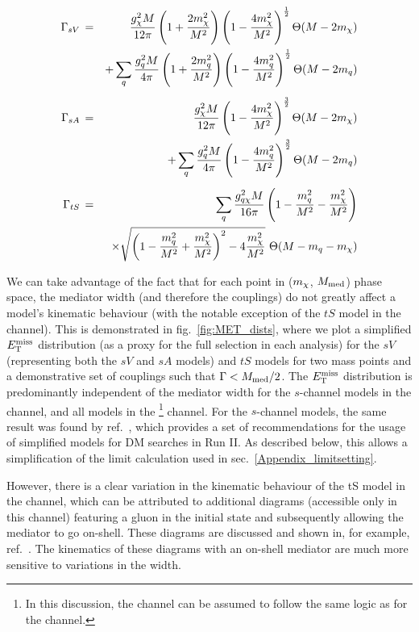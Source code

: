 \begin{eqnarray}
    \Gamma_{sV} \, &=& \,  \frac{g_{\chi}^2 M}{12\pi}\left(1 + \frac{2 m_{\chi}^{2}}{M^{2}}\right)\left(1 - \frac{4 m_{\chi}^{2}}{M^{2}}\right)^{\frac{1}{2}} \Theta(M-2 m_{\chi}) \nonumber\\
                  && + \sum_{\substack{q}}\frac{g_q^2M}{4\pi}\left(1 + \frac{2m_{q}^{2}}{M^{2}}\right)\left(1 - \frac{4m_{q}^{2}}{M^{2}}\right)^{\frac{1}{2}} \Theta(M-2m_q)\\[5pt]
    \Gamma_{sA} \, &=& \,  \frac{g_{\chi}^2 M}{12\pi}\left(1 - \frac{4 m_{\chi}^{2}}{M^{2}}\right)^{\frac{3}{2}} \Theta(M-2 m_{\chi}) \nonumber\\
                  && + \sum_{\substack{q}}\frac{g_q^2 M}{4\pi}\left(1 - \frac{4m_{q}^{2}}{M^{2}}\right)^{\frac{3}{2}} \Theta(M-2m_q) \\[5pt]
    \Gamma_{tS} \, &=& \,  \sum_{\substack{q}} \frac{g_{q \chi}^2M}{16\pi}\left(1 - \frac{m_{q}^{2}}{M^{2}} - \frac{m_{\chi}^{2}}{M^{2}}\right) \nonumber\\
                  && \times \sqrt{\left(1 - \frac{m_{q}^{2}}{M^{2}} + \frac{m_{\chi}^{2}}{M^{2}}\right)^{2} - 4\frac{m_{\chi}^{2}}{M^{2}}} \,\, \Theta(M-m_q- m_{\chi})
\end{eqnarray}

We can take advantage of the fact that for each point in ($m_{\chi}$, $M_{\mathrm{med}}$) phase space, the mediator width (and therefore the couplings) do not greatly affect a model's kinematic behaviour (with the notable exception of the $tS$ model in the \monojet channel). This is demonstrated in fig.~\ref{fig:MET_dists}, where we plot a simplified $E_{\mathrm{T}}^{\mathrm{miss}}$ distribution (as a proxy for the full selection in each analysis) for the $sV$ (representing both the $sV$ and $sA$ models) and $tS$ models for two mass points and a demonstrative set of couplings such that $\Gamma < M_{\mathrm{med}}/2$. The $E_{\mathrm{T}}^{\mathrm{miss}}$ distribution is predominantly independent of the mediator width for the $s$-channel models in the \monojet channel, and all models in the \monoZ\footnote{In this discussion, the \monoWZ channel can be assumed to follow the same logic as for the \monoZ channel.} channel. For the $s$-channel models, the same result was found by ref.~\cite{DMForumReport}, which provides a set of recommendations for the usage of simplified models for DM searches in Run II. As described below, this allows a simplification of the limit calculation used in sec.~\ref{Appendix_limitsetting}. 

However, there is a clear variation in the kinematic behaviour of the tS model in the \monojet channel, which can be attributed to additional diagrams (accessible only in this channel) featuring a gluon in the initial state and subsequently allowing the mediator to go on-shell. These diagrams are discussed and shown in, for example, ref.~\cite{Zurek:tchannel}. The kinematics of these diagrams with an on-shell mediator are much more sensitive to variations in the width.

